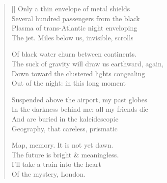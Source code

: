 \label{ch:flight}
\settowidth{\versewidth}{The suck of gravity will draw us earthward, again,}
\begin{verse}[\versewidth]
Only a thin envelope of metal shields\\
Several hundred passengers from the black\\
Plasma of trans-Atlantic night enveloping\\
The jet.     Miles below us, invisible, scrolls

Of black water churn between continents.\\
The suck of gravity will draw us earthward, again,\\
Down toward the clustered lights congealing\\
Out of the night: in this long moment

Suspended above the airport, my past globes\\
In the darkness behind me: all my friends die\\
And are buried in the kaleidescopic\\
Geography, that careless, prismatic

Map, memory.          It is not yet dawn.\\
The future is bright \& meaningless.\\
I'll take a train into the heart\\
         Of the mystery, London.
\end{verse}
